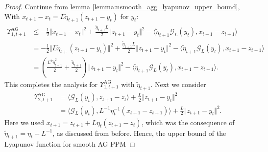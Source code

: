 \documentclass[12pt]{article}
\begin{document}
        \begin{proof}
            Continue from 
            \hyperref[lemma:nsmooth_agg_lyapunov_upper_bound]{lemma \ref*{lemma:nsmooth_agg_lyapunov_upper_bound}}, 
            With $x_{t +1} - x_t = L\tilde\eta_{t+1}(z_{t + 1} - y_t)$ for $y_t$: 
            \begin{align*}
                \Upsilon_{1, t + 1}^\text{AG} &\le 
                - \frac{1}{2}\Vert x_{t + 1} - x_t\Vert^2 
                    + \frac{\tilde\eta_{t + 1}L}{2}\Vert z_{t + 1} - y_t\Vert^2
                    - \langle 
                        \tilde\eta_{t + 1} \mathcal G_L(y_t), 
                        x_{t + 1} - z_{t + 1}
                    \rangle
                    \\
                    &= 
                    - \frac{1}{2}\Vert L \tilde \eta_{t+} (z_{t+1} - y_t)\Vert^2 + 
                    \frac{\tilde\eta_{t +1}L}{2}\Vert z_{t+1} - y_t\Vert^2
                    - \langle 
                        \tilde\eta_{t + 1} \mathcal G_L(y_t), 
                        x_{t + 1} - z_{t + 1}
                    \rangle
                    \\
                    &= 
                    \left(
                        \frac{L^2\tilde\eta_{t + 1}^2}{2}
                        + 
                        \frac{\tilde \eta_{t +1}}{2}
                    \right)
                    \Vert z_{t+1} - y_t\Vert^2
                    - 
                    \langle 
                        \tilde \eta_{t+ 1} \mathcal G_L(y_t), x_{t+1} - z_{t+1}
                    \rangle. 
            \end{align*}
            This completes the analysis for $\Upsilon_{1, t + 1}^\text{AG}$ with $\tilde\eta_{t+1}$. 
            Next we consider 
            \begin{align*}
                \Upsilon_{2, t + 1}^{\text{AG}} 
                &= 
                \langle \mathcal G_L(y_t), z_{t + 1} - z_t\rangle
                + 
                \frac{L }{2} \Vert z_{t+1} - y_t\Vert^2
                \\
                &= 
                \langle \mathcal G_L(y_t), L^{-1}\eta_t^{-1}(x_{t+1} - z_{t + 1})\rangle
                + \frac{L}{2}\Vert z_{t + 1} - y_t\Vert^2. 
            \end{align*}
            Here we used $x_{t + 1} = z_{t + 1} + L\eta_t (z_{t + 1} - z_t)$, which was the consequence of $\tilde\eta_{t + 1} = \eta_t + L^{-1}$, as discussed from before. 
            Hence, the upper bound of the Lyapunov function for smooth AG PPM 

\end{proof}
\end{document}
